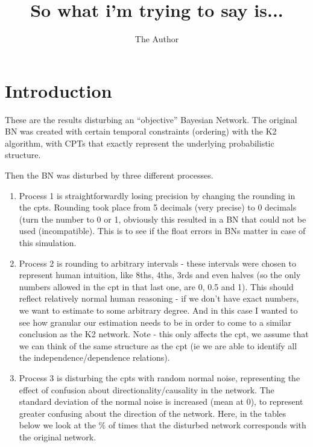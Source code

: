 \documentclass[11pt]{amsart}
\title{So what i'm trying to say is...}
\author{The Author}
\begin{document}
\maketitle

\section{Introduction}
These are the results disturbing an ``objective'' Bayesian Network. The original BN was created with certain temporal constraints (ordering) with the K2 algorithm, with CPTs that exactly represent the underlying probabilistic structure.

Then the BN was disturbed by three different processes.

\begin{enumerate}

\item Process 1 is straightforwardly losing precision by changing the rounding in the cpts. Rounding took place from 5 decimals (very precise) to 0 decimals (turn the number to 0 or 1, obviously this resulted in a BN that could not be used (incompatible). This is to see if the float errors in BNs matter in case of this simulation.

\item Process 2 is rounding to arbitrary intervals - these intervals were chosen to represent human intuition, like 8ths, 4ths, 3rds and even halves (so the only numbers allowed in the cpt in that last one, are 0, 0.5 and 1). This should reflect relatively normal human reasoning - if we don't have exact numbers, we want to estimate to some arbitrary degree. And in this case I wanted to see how granular our estimation needs to be in order to come to a similar conclusion as the K2 network. Note - this only affects the cpt, we assume that we can think of the same structure as the cpt (ie we are able to identify all the independence/dependence relations).

\item Process 3 is disturbing the cpts with random normal noise, representing the effect of confusion about directionality/causality in the network. The standard deviation of the normal noise is increased (mean at 0), to represent greater confusing about the direction of the network. Here, in the tables below we look at the \% of times that the disturbed network corresponds with the original network.
\end{enumerate}
\end{document}
